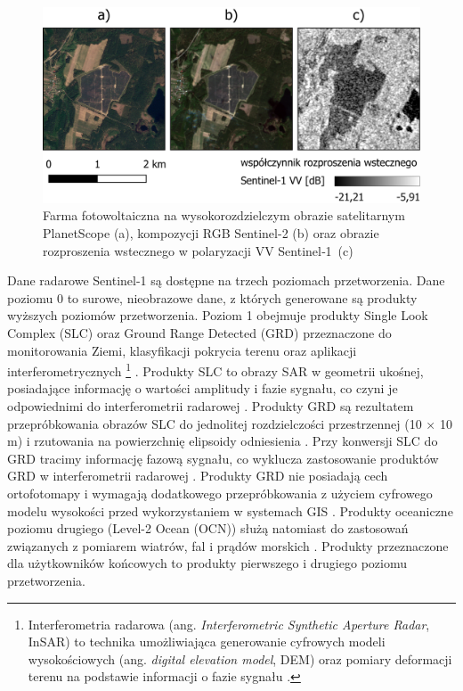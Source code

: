 \documentclass{amuthesis}
\begin{document}
\begin{figure}[t]

{\centering \includegraphics[width=1\textwidth,height=\textheight]{figures/pv_sentinel1.png}

}

\caption{\label{fig-rycina-pv-sentinel1}Farma fotowoltaiczna na
wysokorozdzielczym obrazie satelitarnym PlanetScope (a), kompozycji RGB
Sentinel-2 (b) oraz obrazie rozproszenia wstecznego w polaryzacji VV
Sentinel‑1~(c)}

\end{figure}

Dane radarowe Sentinel-1 są dostępne na trzech poziomach przetworzenia.
Dane poziomu 0 to surowe, nieobrazowe dane, z których generowane są
produkty wyższych poziomów przetworzenia. Poziom 1 obejmuje produkty
Single Look Complex (SLC) oraz Ground Range Detected (GRD) przeznaczone
do monitorowania Ziemi, klasyfikacji pokrycia terenu oraz aplikacji
interferometrycznych \footnote{Interferometria radarowa (ang.
  \emph{Interferometric Synthetic Aperture Radar}, InSAR) to technika
  umożliwiająca generowanie cyfrowych modeli wysokościowych (ang.
  \emph{digital elevation model}, DEM) oraz pomiary deformacji terenu na
  podstawie informacji o fazie sygnału
  \autocite{hanssen_2001_insar,hejmanowska_2020_dane}.}
\autocite{hejmanowska_2020_dane}. Produkty SLC to obrazy SAR w geometrii
ukośnej, posiadające informację o wartości amplitudy i fazie sygnału, co
czyni je odpowiednimi do interferometrii radarowej
\autocite{hejmanowska_2020_dane}. Produkty GRD są rezultatem
przepróbkowania obrazów SLC do jednolitej rozdzielczości przestrzennej
(10 × 10 m) i rzutowania na powierzchnię elipsoidy odniesienia
\autocite{hejmanowska_2020_dane}. Przy konwersji SLC do GRD tracimy
informację fazową sygnału, co wyklucza zastosowanie produktów GRD w
interferometrii radarowej \autocite{sentinel1_products}. Produkty GRD
nie posiadają cech ortofotomapy i wymagają dodatkowego przepróbkowania z
użyciem cyfrowego modelu wysokości przed wykorzystaniem w systemach GIS
\autocite{hejmanowska_2020_dane}. Produkty oceaniczne poziomu drugiego
(Level-2 Ocean (OCN)) służą natomiast do zastosowań związanych z
pomiarem wiatrów, fal i prądów morskich \autocite{sentinel1_ocn}.
Produkty przeznaczone dla użytkowników końcowych to produkty pierwszego
i drugiego poziomu przetworzenia.
\end{document}
